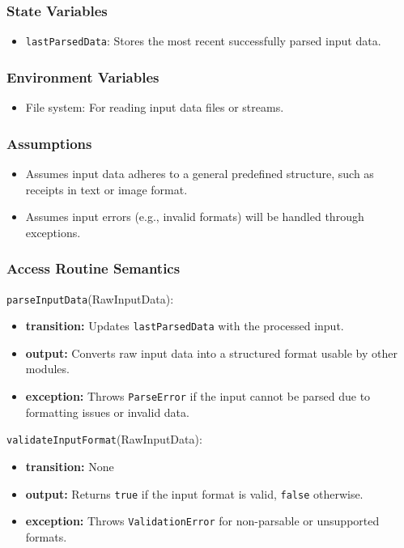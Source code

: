 \documentclass[12pt, titlepage]{article}
\begin{document}
\subsubsection{State Variables}

\begin{itemize}
    \item \texttt{lastParsedData}: Stores the most recent successfully parsed input data.
\end{itemize}

\subsubsection{Environment Variables}

\begin{itemize}
    \item File system: For reading input data files or streams.
\end{itemize}

\subsubsection{Assumptions}

\begin{itemize}
    \item Assumes input data adheres to a general predefined structure, such as receipts in text or image format.
    \item Assumes input errors (e.g., invalid formats) will be handled through exceptions.
\end{itemize}

\subsubsection{Access Routine Semantics}

\noindent \texttt{parseInputData}(RawInputData):
\begin{itemize}
    \item \textbf{transition:} Updates \texttt{lastParsedData} with the processed input.
    \item \textbf{output:} Converts raw input data into a structured format usable by other modules.
    \item \textbf{exception:} Throws \texttt{ParseError} if the input cannot be parsed due to formatting issues or invalid data.
\end{itemize}

\noindent \texttt{validateInputFormat}(RawInputData):
\begin{itemize}
    \item \textbf{transition:} None
    \item \textbf{output:} Returns \texttt{true} if the input format is valid, \texttt{false} otherwise.
    \item \textbf{exception:} Throws \texttt{ValidationError} for non-parsable or unsupported formats.
\end{itemize}
\end{document}

